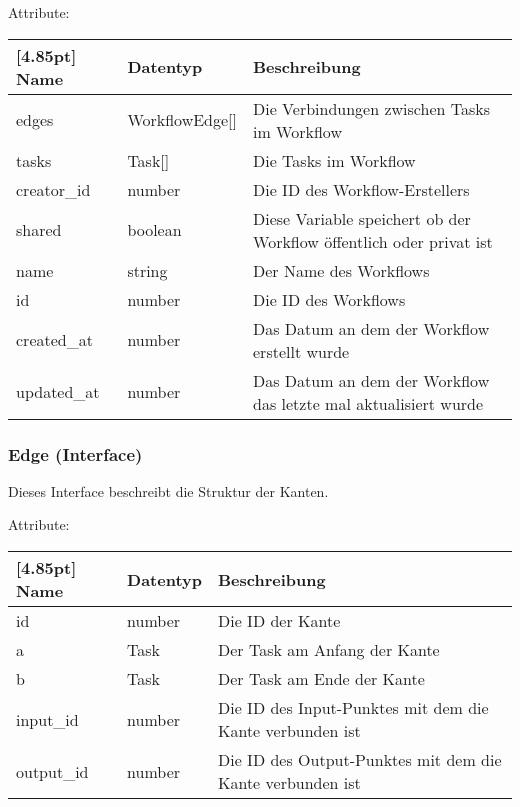 			Attribute:
			\begin{center}
				\renewcommand{\arraystretch}{1.5}
				\setlength\tabcolsep{5pt}
				\begin{tabularx}{\textwidth}{|l|l|X|}
					\hline
					\rowcolor[gray]{0.75}[4.85pt]					
					Name & Datentyp & Beschreibung \\ \hline
					edges & WorkflowEdge[] & Die Verbindungen zwischen Tasks im Workflow \\ \hline
					tasks & Task[] & Die Tasks im Workflow \\ \hline
					creator_id & number & Die ID des Workflow-Erstellers \\ \hline
					shared & boolean & Diese Variable speichert ob der Workflow öffentlich oder privat ist \\ \hline
					name & string & Der Name des Workflows \\ \hline
					id & number & Die ID des Workflows \\ \hline
					created_at & number & Das Datum an dem der Workflow erstellt wurde \\ \hline
					updated_at & number & Das Datum an dem der Workflow das letzte mal aktualisiert wurde \\ \hline
				\end{tabularx}
			\end{center}
				
			\subsubsection{Edge (Interface)}
			
			Dieses Interface beschreibt die Struktur der Kanten.\newline
			
			Attribute:
			\begin{center}
				\renewcommand{\arraystretch}{1.5}
				\setlength\tabcolsep{5pt}
				\begin{tabularx}{\textwidth}{|l|l|X|}
					\hline
					\rowcolor[gray]{0.75}[4.85pt]					
					Name & Datentyp & Beschreibung \\ \hline
					 id & number & Die ID der Kante \\ \hline
					 a & Task & Der Task am Anfang der Kante \\ \hline
					 b & Task & Der Task am Ende der Kante \\ \hline
					 input_id & number & Die ID des Input-Punktes mit dem die Kante verbunden ist \\ \hline
					 output_id & number & Die ID des Output-Punktes mit dem die Kante verbunden ist \\ \hline
				\end{tabularx}
			\end{center}
\newpage

